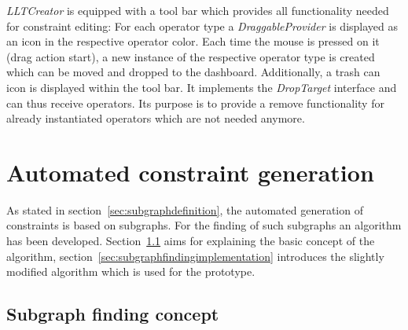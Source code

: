 
\emph{LLTCreator} is equipped with a tool bar which provides all functionality needed for constraint editing: For each operator type a \emph{DraggableProvider} is displayed as an icon in the respective operator color. Each time the mouse is pressed on it (drag action start), a new instance of the respective operator type is created which can be moved and dropped to the dashboard. Additionally, a trash can icon is displayed within the tool bar. It implements the \emph{DropTarget} interface and can thus receive operators. Its purpose is to provide a remove functionality for already instantiated operators which are not needed anymore.









\section{Automated constraint generation}
\label{sec:prototype:automatedconstraintgeneration}

As stated in section~\ref{sec:subgraphdefinition}, the automated generation of constraints is based on subgraphs. For the finding of such subgraphs an algorithm has been developed. Section~\ref{sec:subgraphfindingconcept} aims for explaining the basic concept of the algorithm, section~\ref{sec:subgraphfindingimplementation} introduces the slightly modified algorithm which is used for the prototype.


\subsection{Subgraph finding concept}
\label{sec:subgraphfindingconcept}

